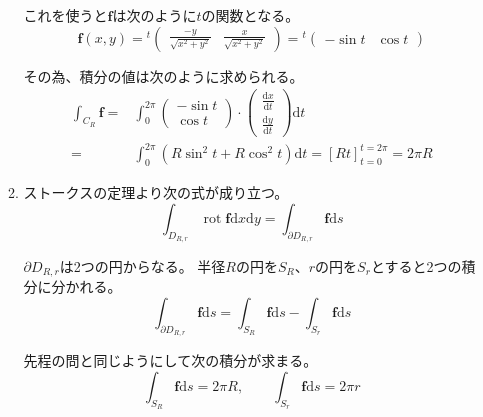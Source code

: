 \documentclass[12pt,b5paper]{ltjsarticle}
\DeclareMathOperator{\Rot}{rot}
\begin{document}
\begin{enumerate}
\begin{enumerate}
            これを使うと$\bm{f}$は次のように$t$の関数となる。
            \begin{equation}
             \bm{f}(x,y)={}^{t}\begin{pmatrix} \frac{-y}{\sqrt{x^2+y^2}} & \frac{x}{\sqrt{x^2+y^2}} \end{pmatrix}
             ={}^{t}\begin{pmatrix} -\sin t & \cos t \end{pmatrix}
            \end{equation}

            その為、積分の値は次のように求められる。
            \begin{align}
             \int_{C_R}\bm{f} =& \int_{0}^{2\pi}
             \begin{pmatrix} -\sin t \\ \cos t \end{pmatrix}\cdot
             \begin{pmatrix} \frac{\mathrm{d}x}{\mathrm{d}t} \\ \frac{\mathrm{d}y}{\mathrm{d}t} \end{pmatrix}
             \mathrm{d}t\\
             =& \int_{0}^{2\pi} (R\sin^2 t + R\cos^2 t) \mathrm{d}t
             = [Rt]_{t=0}^{t=2\pi} =2\pi R
            \end{align}

       \item
            ストークスの定理より次の式が成り立つ。
            \begin{equation}
             \int_{D_{R,r}}\Rot\bm{f}\mathrm{d}x\mathrm{d}y
              = \int_{\partial D_{R,r}}\bm{f}\mathrm{d}s
            \end{equation}

            $\partial D_{R,r}$は2つの円からなる。
            半径$R$の円を$S_R$、$r$の円を$S_r$とすると2つの積分に分かれる。
            \begin{equation}
             \int_{\partial D_{R,r}}\bm{f}\mathrm{d}s
              = \int_{S_{R}}\bm{f}\mathrm{d}s
              - \int_{S_{r}}\bm{f}\mathrm{d}s
            \end{equation}

            先程の問と同じようにして次の積分が求まる。
            \begin{equation}
             \int_{S_{R}}\bm{f}\mathrm{d}s = 2\pi R
             ,\qquad
             \int_{S_{r}}\bm{f}\mathrm{d}s = 2\pi r
            \end{equation}


\end{enumerate}
\end{enumerate}
\end{document}
